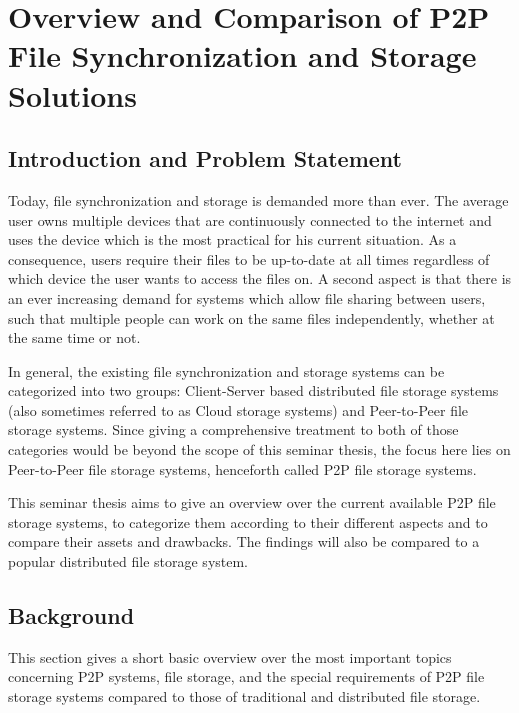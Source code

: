 \chapter{Overview and Comparison of P2P File Synchronization and Storage Solutions}


\newpage

\minitoc

\newpage

\section{Introduction and Problem Statement} Today, file synchronization and storage is demanded more than ever. The average user owns multiple devices that are continuously connected to the internet and uses the device which is the most practical for his current situation. As a consequence, users require their files to be up-to-date at all times regardless of which device the user wants to access the files on. A second aspect is that there is an ever increasing demand for systems which allow file sharing between users, such that multiple people can work on the same files independently, whether at the same time or not.

In general, the existing file synchronization and storage systems can be categorized into two groups: Client-Server based distributed file storage systems (also sometimes referred to as Cloud storage systems) and Peer-to-Peer file storage systems. Since giving a comprehensive treatment to both of those categories would be beyond the scope of this seminar thesis, the focus here lies on Peer-to-Peer file storage systems, henceforth called P2P file storage systems.

This seminar thesis aims to give an overview over the current available P2P file storage systems, to categorize them according to their different aspects and to compare their assets and drawbacks. The findings will also be compared to a popular distributed file storage system.


\section{Background} %
This section gives a short basic overview over the most important topics concerning P2P systems, file storage, and the special requirements of P2P file storage systems compared to those of traditional and distributed file storage.

